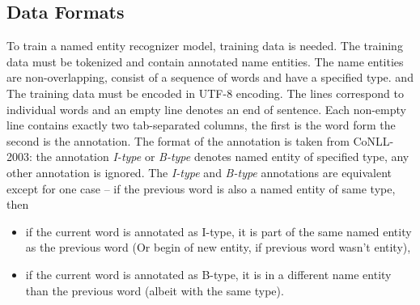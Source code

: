 \subsection{Data Formats}
To train a named entity recognizer model, training data is needed. The training data must be tokenized and contain annotated name entities. The name entities are non-overlapping, consist of a sequence of words and have a specified type.
and
The training data must be encoded in UTF-8 encoding. The lines correspond to individual words and an empty line denotes an end of sentence. Each non-empty line contains exactly two tab-separated columns, the first is the word form the second is the annotation. The format of the annotation is taken from CoNLL-2003: the annotation {\it I-type} or {\it B-type} denotes named entity of specified type, any other annotation is ignored. The {\it I-type} and {\it B-type} annotations are equivalent except for one case – if the previous word is also a named entity of same type, then
\begin{itemize}
\item{}if the current word is annotated as I-type, it is part of the same named entity as the previous word (Or begin of new entity, if previous word wasn't entity),
\item{}if the current word is annotated as B-type, it is in a different name entity than the previous word (albeit with the same type).
\end{itemize}
